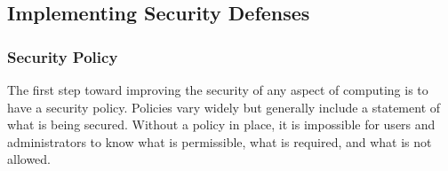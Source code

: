 \subsection{Implementing Security Defenses}\label{subsec:Implementing_Security_Defenses}
\subsubsection{Security Policy}\label{subsubsec:Security_Policy}
The first step toward improving the security of any aspect of computing is to have a security policy.
Policies vary widely but generally include a statement of what is being secured.
Without a policy in place, it is impossible for users and administrators to know what is permissible, what is required, and what is not allowed.


